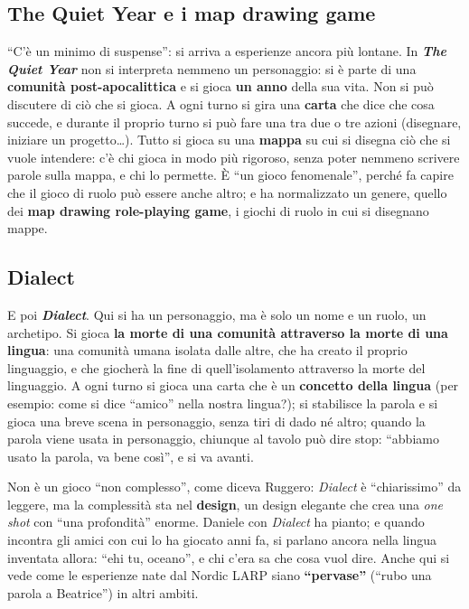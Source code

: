 \subsection{The Quiet Year e i map drawing game}



``C'è un minimo di suspense'': si arriva a esperienze ancora più lontane.
In \textbf{\emph{The Quiet Year}} non si interpreta nemmeno un personaggio: si è
parte di una \textbf{comunità post-apocalittica} e si gioca \textbf{un anno} della
sua vita. Non si può discutere di ciò che si gioca. A ogni turno si gira una
\textbf{carta} che dice che cosa succede, e durante il proprio turno si può fare
una tra due o tre azioni (disegnare, iniziare un progetto\ldots). Tutto si gioca
su una \textbf{mappa} su cui si disegna ciò che si vuole intendere: c'è chi gioca
in modo più rigoroso, senza poter nemmeno scrivere parole sulla mappa, e chi lo
permette. È ``un gioco fenomenale'', perché fa capire che il gioco di ruolo può
essere anche altro; e ha normalizzato un genere, quello dei \textbf{map drawing
role-playing game}, i giochi di ruolo in cui si disegnano mappe.

\subsection{Dialect}



E poi \textbf{\emph{Dialect}}. Qui si ha un personaggio, ma è solo un nome e un
ruolo, un archetipo. Si gioca \textbf{la morte di una comunità attraverso la
morte di una lingua}: una comunità umana isolata dalle altre, che ha creato il
proprio linguaggio, e che giocherà la fine di quell'isolamento attraverso la
morte del linguaggio. A ogni turno si gioca una carta che è un \textbf{concetto
della lingua} (per esempio: come si dice ``amico'' nella nostra lingua?); si
stabilisce la parola e si gioca una breve scena in personaggio, senza tiri di
dado né altro; quando la parola viene usata in personaggio, chiunque al tavolo
può dire stop: ``abbiamo usato la parola, va bene così'', e si va avanti.

Non è un gioco ``non complesso'', come diceva Ruggero: \emph{Dialect} è
``chiarissimo'' da leggere, ma la complessità sta nel \textbf{design}, un design
elegante che crea una \emph{one shot} con ``una profondità'' enorme. Daniele con
\emph{Dialect} ha pianto; e quando incontra gli amici con cui lo ha giocato anni
fa, si parlano ancora nella lingua inventata allora: ``ehi tu, oceano'', e chi
c'era sa che cosa vuol dire. Anche qui si vede come le esperienze nate dal Nordic
LARP siano \textbf{``pervase''} (``rubo una parola a Beatrice'') in altri ambiti.

